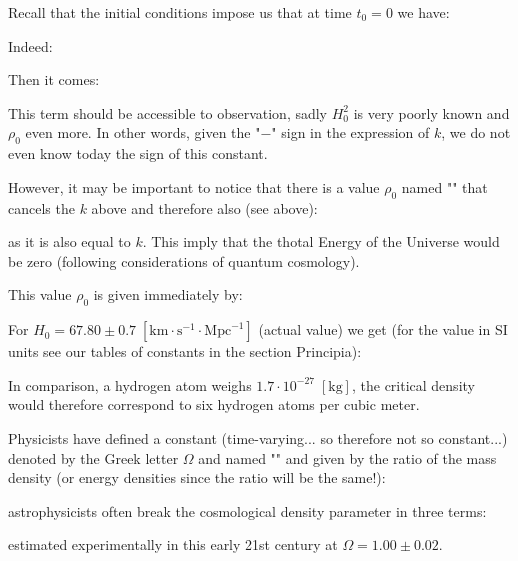	Recall that the initial conditions impose us that at time $t_0=0$ we have:
	
	Indeed:
	
	Then it comes:
	
	This term should be accessible to observation, sadly $H_0^2$ is very poorly known and $\rho_0$ even more. In other words, given the "$-$" sign in the expression of $k$, we do not even know today the sign of this constant.
	
	However, it may be important to notice that there is a value $\rho_0$ named "" that cancels the $k$ above and therefore also (see above):
	
	as it is also equal to $k$. This imply that the thotal Energy of the Universe would be zero (following considerations of quantum cosmology).

	This value $\rho_0$ is given immediately by:
	
	For $H_0=67.80\pm 0.7\;[\text{km} \cdot\text{s}^{-1}\cdot\text{Mpc}^{-1}]$ (actual value) we get (for the value in SI units see our tables of constants in the section Principia):
	
	In comparison, a hydrogen atom weighs $1.7\cdot 10^{-27}\;[\text{kg}]$, the critical density would therefore correspond to six hydrogen atoms per cubic meter.

	Physicists have defined a constant (time-varying... so therefore not so constant...) denoted by the Greek letter $\Omega$ and named "" and given by the ratio of the mass density (or energy densities since the ratio will be the same!):
	
	astrophysicists often break the cosmological density parameter in three terms:
	
	estimated  experimentally in this early 21st century at $\Omega=1.00\pm0.02$.
	
